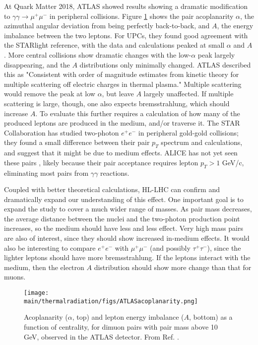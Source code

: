 \documentclass[../report.tex]{subfiles}
\providecommand{\main}{..}
\begin{document}
At Quark Matter 2018, ATLAS  \cite{Aaron}  showed results showing a dramatic modification to $\gamma\gamma\rightarrow\mu^+\mu^-$ in peripheral collisions.  Figure \ref{fig:ATLASacoplanarity} shows the pair acoplanarity $\alpha$, the azimuthal angular deviation from being perfectly back-to-back, and $A$, the energy imbalance between the two leptons.  For UPCs, they found good agreement with the STARlight \cite{Baltz:2009jk,Klein:2016yzr} reference, with the data and calculations peaked at small $\alpha$ and $A$.   More central collisions show dramatic changes with the low-$\alpha$ peak largely disappearing, and the $A$ distributions only minimally changed.  ATLAS described this as "Consistent with order of magnitude estimates from kinetic theory for multiple scattering off electric charges in thermal plasma."  Multiple scattering would remove the peak at low $\alpha$, but leave $A$ largely unaffected.  If multiple scattering is large, though, one also expects bremsstrahlung, which should increase $A$.   To evaluate this further requires a calculation of how many of the produced leptons are produced in the medium, and/or traverse it.  The STAR Collaboration has studied two-photon $e^+e^-$ in peripheral gold-gold collisions; they found a small difference between their pair $p_T$ spectrum and calculations, and suggest that it might be due to medium effects\cite{Adam:2018tdm}.    ALICE has not yet seen these pairs \cite{Adam:2015gba}, likely because their pair acceptance requires  lepton $p_T > 1$ GeV/c, eliminating most pairs from $\gamma\gamma$ reactions. 

Coupled with better theoretical calculations, HL-LHC can confirm and dramatically expand our understanding of this effect.   One important goal is to expand the study to cover a much wider range of masses.  As pair mass decreases, the average distance between the nuclei and the two-photon production point increases, so the medium should have less and less effect.  Very high mass pairs are also of interest, since they should show increased  in-medium effects.   It would also be interesting to compare $e^+e^-$ with $\mu^+\mu^-$ (and possibly $\tau^+\tau^-$), since the lighter leptons should have more bremsstrahlung.  If the leptons interact with the medium, then the electron $A$ distribution should show more change than that for muons.  

\begin{figure}[htb]
\centering
\texttt{[image: \\main/thermalradiation/figs/ATLASacoplanarity.png]}
\caption{Acoplanarity ($\alpha$, top) and lepton energy imbalance ($A$, bottom) as a function of centrality, for dimuon pairs with pair mass above 10 GeV, observed in the ATLAS detector.  From Ref. \cite{Aaron}.}
\label{fig:ATLASacoplanarity}
\end{figure}
\end{document}

